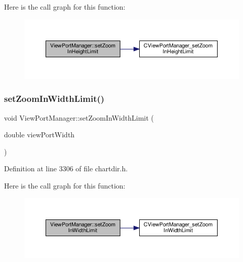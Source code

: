 Here is the call graph for this function\+:
\nopagebreak
\begin{figure}[H]
\begin{center}
\leavevmode
\includegraphics[width=350pt]{class_view_port_manager_aa3522d8d5cccfc890922fcbbe12eb919_cgraph}
\end{center}
\end{figure}
\mbox{\label{class_view_port_manager_ab6ea404e7837addeb3d4cf8015adfa4c}} 
\subsubsection{\texorpdfstring{set\+Zoom\+In\+Width\+Limit()}{setZoomInWidthLimit()}}
{\footnotesize\ttfamily void View\+Port\+Manager\+::set\+Zoom\+In\+Width\+Limit (\begin{DoxyParamCaption}\item[{double}]{view\+Port\+Width }\end{DoxyParamCaption})\hspace{0.3cm}{\ttfamily [inline]}}



Definition at line 3306 of file chartdir.\+h.

Here is the call graph for this function\+:
\nopagebreak
\begin{figure}[H]
\begin{center}
\leavevmode
\includegraphics[width=350pt]{class_view_port_manager_ab6ea404e7837addeb3d4cf8015adfa4c_cgraph}
\end{center}
\end{figure}
\mbox{\label{class_view_port_manager_a050d927a278c1c37dc97ea2ccb00ca17}} 
